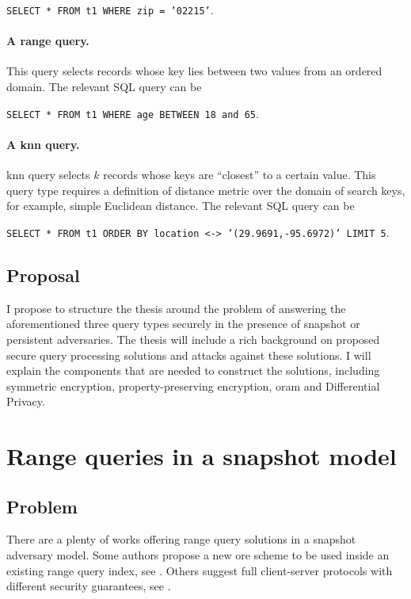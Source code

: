 					\texttt{SELECT * FROM t1 WHERE zip = '02215'}.

				\paragraph*{A range query.}
					This query selects records whose key lies between two values from an ordered domain.
					The relevant SQL query can be

					\texttt{SELECT * FROM t1 WHERE age BETWEEN 18 and 65}.

				\paragraph*{A \acrshort{knn} query.}
					\acrlong{knn} query selects $k$ records whose keys are ``closest'' to a certain value.
					This query type requires a definition of distance metric over the domain of search keys, for example, simple Euclidean distance.
					The relevant SQL query can be

					\texttt{SELECT * FROM t1 ORDER BY location <-> '(29.9691,-95.6972)' LIMIT 5}. %

		\subsection{Proposal}

			I propose to structure the thesis around the problem of answering the aforementioned three query types securely in the presence of snapshot or persistent adversaries.
			The thesis will include a rich background on proposed secure query processing solutions and attacks against these solutions.
			I will explain the components that are needed to construct the solutions, including symmetric encryption, property-preserving encryption, \acrlong{oram} and Differential Privacy.

	\section{Range queries in a snapshot model}

		\subsection{Problem}

			There are a plenty of works offering range query solutions in a snapshot adversary model.
			Some authors propose a new \acrfull{ore} scheme to be used inside an existing range query index, see \cite{bclo-ope,clww-ore,lewi-wu-ore,cloz-ore,fh-ope}.
			Others suggest full client-server protocols with different security guarantees, see \cite{florian-protocol,pope,practical-ore}.

